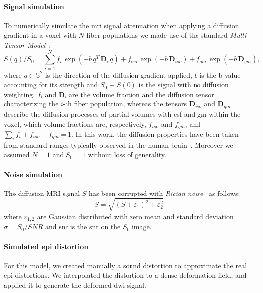 \paragraph{Signal simulation}
To numerically simulate the \gls{mri} signal attenuation when applying a diffusion 
gradient in a voxel with $N$ fiber populations we made use of the standard 
\emph{Multi-Tensor Model}~\cite{Tuch:2002aa}:
%
\begin{equation} 
\label{eqn:MultiTensor}
S(q) / S_{0} = \sum_{i=1}^{N} f_{i} \, \exp{ \left( -b \, q^{T} \, \mathbf{D}_i \, q\right) } + f_{iso} \, \exp{ \left( -b \, \mathbf{D}_{iso} \right) }  + f_{gm} \, \exp{ \left( -b \, \mathbf{D}_{gm} \right) } ,
\end{equation}
%
where $q \in \mathbb{S}^2$ is the direction of the diffusion gradient applied,
$b$ is the b-value accounting for its strength and $S_0 \equiv S(0)$ is the 
signal with no diffusion weighting. $f_i$ and $\mathbf{D}_i$ are the volume 
fraction and the diffusion tensor characterizing the $i$-th fiber population, 
whereas the tensors $\mathbf{D}_{iso}$ and $\mathbf{D}_{gm}$ describe the 
diffusion processes of partial volumes with \gls{csf} and \gls{gm} within the 
voxel, which volume fractions are, respectively, $f_{iso}$ and $f_{gm}$, and
$\sum_i f_i + f_{iso} + f_{gm} = 1$. In this work, the diffusion properties have
been taken from standard ranges typically observed in the human 
brain~\cite{Canales-Rodriguez:2009aa}. Moreover we assumed $N = 1$ and $S_0 = 1$ 
without loss of generality.

\paragraph{Noise simulation}
The diffusion MRI signal $S$ has been corrupted with 
\textit{Rician noise}~\cite{Gudbjartsson:1995aa} as follows:
%
\begin{equation}
	\tilde{S} = \sqrt{ (S + \varepsilon_1)^2 + \varepsilon_2^2 }
\end{equation}
%
where $\varepsilon_{1,2}$ are Gaussian distributed with zero mean
and standard deviation $\sigma = S_0 / \mathit{SNR}$ and \gls{snr}
is the \gls{snr} on the $S_0$ image.

\paragraph{Simulated \gls{epi} distortion}
For this model, we created manually a sound distortion to approximate
the real \gls{epi} distortions. We interpolated the distortion to a 
dense deformation field, and applied it to generate the deformed \gls{dwi}
signal.

